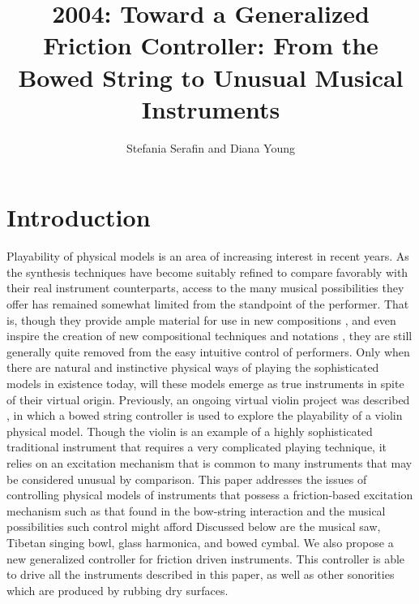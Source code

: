 
\graphicspath{ {mainmatter/Serafin_2004/} }
\title*{2004: Toward a Generalized Friction Controller: From the Bowed
String to Unusual Musical Instruments}


\author{Stefania Serafin and Diana Young}

%

%
\maketitle


\section{Introduction}
Playability of physical models is an area of increasing interest in recent years. As the synthesis techniques have become suitably refined to compare favorably with their real instrument counterparts, access to the many musical possibilities they offer has remained somewhat limited from the standpoint of the performer. That is, though they provide ample material for use in new compositions \cite{Serafin:2003a}, and even inspire the creation of new compositional techniques and notations \cite{Burtner:2003}, they are still generally quite removed from the easy intuitive control of performers. Only when there are natural and instinctive physical ways of playing the sophisticated models in existence today, will these models emerge as true instruments in spite of their virtual origin. Previously, an ongoing virtual violin project was described \cite{Serafin:2003,Young:2003b}, in which a bowed string controller is used to explore the playability of a violin physical model. Though the violin is an example of a highly sophisticated traditional instrument that requires a very complicated playing technique, it relies on an excitation mechanism that is common to many instruments that may be considered unusual by comparison. This paper addresses the issues of controlling physical models of instruments that possess a friction-based excitation mechanism such as that found in the bow-string interaction and the musical possibilities such control might afford Discussed below are the musical saw, Tibetan singing bowl, glass harmonica, and bowed cymbal. We also propose a new generalized controller for friction driven instruments. This controller is able to drive all the instruments described in this paper, as well as other sonorities which are produced by rubbing dry surfaces.

